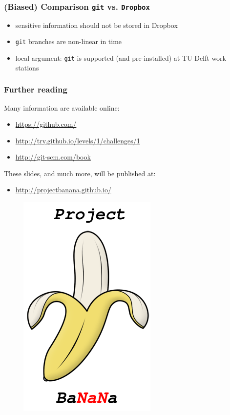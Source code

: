 \documentclass{beamer}
\begin{document}
\begin{frame}
\frametitle{(Biased) Comparison \texttt{git} vs. \texttt{Dropbox}}
\begin{itemize}
 \item sensitive information should not be stored in Dropbox
 \item \texttt{git} branches are non-linear in time
 \item local argument: \texttt{git} is supported (and pre-installed) at TU Delft work stations
\end{itemize}
\end{frame}
\begin{frame}
\frametitle{Further reading}
Many information are available online:
\begin{itemize}
 \item \url{https://github.com/}
 \item \url{http://try.github.io/levels/1/challenges/1}
 \item \url{http://git-scm.com/book}
\end{itemize}
These slides, and much more, will be published at:
\begin{itemize}
 \item \url{http://projectbanana.github.io/}
\end{itemize}
 \begin{figure}
\centering
 \includegraphics[height=0.3\textheight]{../../images/logo}
\end{figure}

\end{frame}
\end{document}
